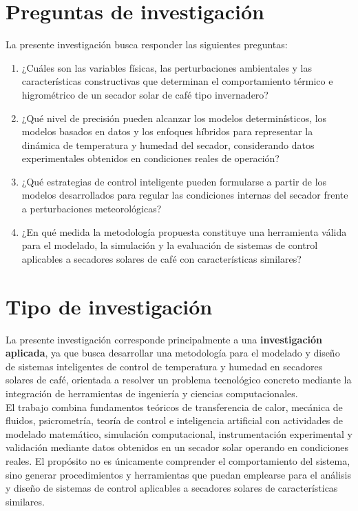 \section{Preguntas de investigación}

La presente investigación busca responder las siguientes preguntas:

\begin{enumerate}

\item ¿Cuáles son las variables físicas, las perturbaciones ambientales y las características constructivas que determinan el comportamiento térmico e higrométrico de un secador solar de café tipo invernadero?

\item ¿Qué nivel de precisión pueden alcanzar los modelos determinísticos, los modelos basados en datos y los enfoques híbridos para representar la dinámica de temperatura y humedad del secador, considerando datos experimentales obtenidos en condiciones reales de operación?

\item ¿Qué estrategias de control inteligente pueden formularse a partir de los modelos desarrollados para regular las condiciones internas del secador frente a perturbaciones meteorológicas?

\item ¿En qué medida la metodología propuesta constituye una herramienta válida para el modelado, la simulación y la evaluación de sistemas de control aplicables a secadores solares de café con características similares?

\end{enumerate}

\section{Tipo de investigación}
La presente investigación corresponde principalmente a una \textbf{investigación aplicada}, ya que busca desarrollar una metodología para el modelado y diseño de sistemas inteligentes de control de temperatura y humedad en secadores solares de café, orientada a resolver un problema tecnológico concreto mediante la integración de herramientas de ingeniería y ciencias computacionales.\\

El trabajo combina fundamentos teóricos de transferencia de calor, mecánica de fluidos, psicrometría, teoría de control e inteligencia artificial con actividades de modelado matemático, simulación computacional, instrumentación experimental y validación mediante datos obtenidos en un secador solar operando en condiciones reales. El propósito no es únicamente comprender el comportamiento del sistema, sino generar procedimientos y herramientas que puedan emplearse para el análisis y diseño de sistemas de control aplicables a secadores solares de características similares.\\

